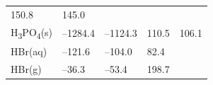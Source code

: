 \documentclass[
  9pt,
]{extbook}
\theoremstyle{definition}
\theoremstyle{definition}
\theoremstyle{definition}
\theoremstyle{remark}
\begin{document}
\begin{longtable}[]{@{}lllll@{}}
\begin{minipage}[t]{0.18\columnwidth}
150.8\strut
\end{minipage} & \begin{minipage}[t]{0.18\columnwidth}\raggedright
145.0\strut
\end{minipage}\tabularnewline
\begin{minipage}[t]{0.10\columnwidth}\raggedright
H\textsubscript{3}PO\textsubscript{4}(s)\strut
\end{minipage} & \begin{minipage}[t]{0.19\columnwidth}\raggedright
--1284.4\strut
\end{minipage} & \begin{minipage}[t]{0.20\columnwidth}\raggedright
--1124.3\strut
\end{minipage} & \begin{minipage}[t]{0.18\columnwidth}\raggedright
110.5\strut
\end{minipage} & \begin{minipage}[t]{0.18\columnwidth}\raggedright
106.1\strut
\end{minipage}\tabularnewline
\begin{minipage}[t]{0.10\columnwidth}\raggedright
HBr(aq)\strut
\end{minipage} & \begin{minipage}[t]{0.19\columnwidth}\raggedright
--121.6\strut
\end{minipage} & \begin{minipage}[t]{0.20\columnwidth}\raggedright
--104.0\strut
\end{minipage} & \begin{minipage}[t]{0.18\columnwidth}\raggedright
82.4\strut
\end{minipage} & \begin{minipage}[t]{0.18\columnwidth}\raggedright
\strut
\end{minipage}\tabularnewline
\begin{minipage}[t]{0.10\columnwidth}\raggedright
HBr(g)\strut
\end{minipage} & \begin{minipage}[t]{0.19\columnwidth}\raggedright
--36.3\strut
\end{minipage} & \begin{minipage}[t]{0.20\columnwidth}\raggedright
--53.4\strut
\end{minipage} & \begin{minipage}[t]{0.18\columnwidth}\raggedright
198.7\strut
\end{minipage} & \begin{minipage}[t]{0.18\columnwidth}\raggedright

\end{minipage}
\end{longtable}
\end{document}
